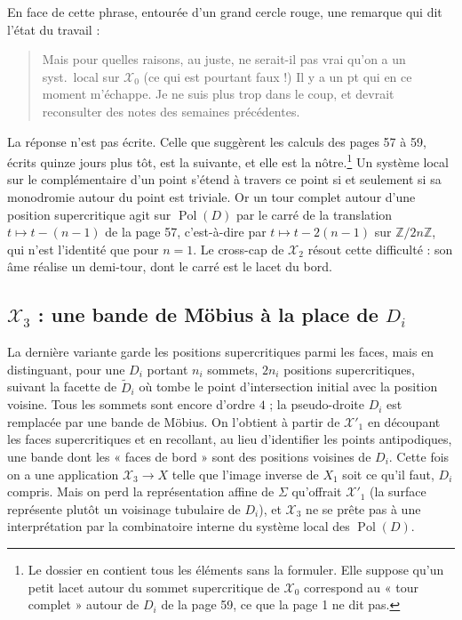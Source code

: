 \documentclass[11pt,a4paper]{article}
\begin{document}
En face de cette phrase, entourée d'un grand cercle rouge, une remarque qui
dit l'état du travail :
\begin{quote}
Mais pour quelles raisons, au juste, ne serait-il pas vrai qu'on a un syst.\
local sur $\mathcal{X}_0$ (ce qui est pourtant faux !) Il y a un pt qui en ce
moment m'échappe. Je ne suis plus trop dans le coup, et devrait reconsulter des
notes des semaines précédentes.
\end{quote}
La réponse n'est pas écrite. Celle que suggèrent les calculs des pages 57 à
59, écrits quinze jours plus tôt, est la suivante, et elle est la
nôtre.\footnote{Le dossier en contient tous les éléments sans la formuler.
Elle suppose qu'un petit lacet autour du
sommet supercritique de $\mathcal{X}_0$ correspond au « tour complet » autour
de $D_i$ de la page 59, ce que la page 1 ne dit pas.} Un système local sur le
complémentaire d'un point s'étend à travers ce point si et seulement si sa
monodromie autour du point est triviale. Or un tour complet autour d'une
position supercritique agit sur $\operatorname{Pol}(D)$ par le carré de la
translation $t \mapsto t - (n-1)$ de la page 57, c'est-à-dire par
$t \mapsto t - 2(n-1)$ sur $\mathbb{Z}/2n\mathbb{Z}$, qui n'est l'identité que
pour $n = 1$. Le cross-cap de $\mathcal{X}_2$ résout cette
difficulté : son âme réalise un demi-tour, dont le carré est le lacet du bord.

\subsection*{$\mathcal{X}_3$ : une bande de Möbius à la place de $D_i$}

La dernière variante garde les positions supercritiques parmi les faces, mais
en distinguant, pour une $D_i$ portant $n_i$ sommets, $2n_i$ positions
supercritiques, suivant la facette de $\widetilde{D}_i$ où tombe le point
d'intersection initial avec la position voisine. Tous les sommets sont encore
d'ordre $4$ ; la pseudo-droite $D_i$ est remplacée par une bande de Möbius. On
l'obtient à partir de $\mathcal{X}'_1$ en découpant les faces supercritiques
et en recollant, au lieu d'identifier les points antipodiques, une bande dont
les « faces de bord » sont des positions voisines de $D_i$. Cette fois on a une
application $\mathcal{X}_3 \to X$ telle que l'image inverse de $X_1$ soit ce
qu'il faut, $D_i$ compris. Mais on perd la représentation affine de $\Sigma$
qu'offrait $\mathcal{X}'_1$ (la surface représente plutôt un voisinage
tubulaire de $D_i$), et $\mathcal{X}_3$ ne se prête pas à une interprétation
par la combinatoire interne du système local des $\operatorname{Pol}(D)$.
\end{document}
